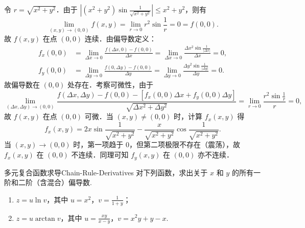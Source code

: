 \begin{myproof}
    令 $r = \sqrt{x^2 + y^2}$．由于 $\left| (x^2 + y^2) \sin \frac{1}{\sqrt{x^2+y^2}} \right| \leq x^2 + y^2$，则有
    \begin{equation}
        \lim_{(x,y) \to (0,0)} f(x,y) = \lim_{r \to 0} r^2 \sin \frac{1}{r} = 0 = f(0,0).
    \end{equation}
    故 $f(x,y)$ 在点 $(0,0)$ 连续．由偏导数定义：
    \begin{equation}
        \begin{aligned}
            f_x(0,0) & = \lim_{\Delta x \to 0} \frac{f(\Delta x, 0) - f(0,0)}{\Delta x} = \lim_{\Delta x \to 0} \frac{\Delta x^2 \sin \frac{1}{|\Delta x|}}{\Delta x} = 0, \\
            f_y(0,0) & = \lim_{\Delta y \to 0} \frac{f(0, \Delta y) - f(0,0)}{\Delta y} = \lim_{\Delta y \to 0} \frac{\Delta y^2 \sin \frac{1}{|\Delta y|}}{\Delta y} = 0.
        \end{aligned}
    \end{equation}
    故偏导数在 $(0,0)$ 处存在．考察可微性，由于
    \begin{equation}
        \lim_{(\Delta x, \Delta y) \to (0,0)} \frac{f(\Delta x, \Delta y) - f(0,0) - [f_x(0,0) \Delta x + f_y(0,0) \Delta y]}{\sqrt{\Delta x^2 + \Delta y^2}} = \lim_{r \to 0} \frac{r^2 \sin \frac{1}{r}}{r} = 0,
    \end{equation}
    故 $f(x,y)$ 在点 $(0,0)$ 可微．当 $(x,y) \neq (0,0)$ 时，计算 $f_x(x,y)$ 得
    \begin{equation}
        f_x(x,y) = 2x \sin \frac{1}{\sqrt{x^2 + y^2}} - \frac{x}{\sqrt{x^2 + y^2}} \cos \frac{1}{\sqrt{x^2 + y^2}}.
    \end{equation}
    当 $(x,y) \to (0,0)$ 时，第一项趋于 $0$，但第二项极限不存在（震荡），故 $f_x(x,y)$ 在 $(0,0)$ 不连续．同理可知 $f_y(x,y)$ 在 $(0,0)$ 亦不连续．
\end{myproof}

\begin{problem}{多元复合函数求导}{Chain-Rule-Derivatives}
    对下列函数，求出关于 $x$ 和 $y$ 的所有一阶和二阶（含混合）偏导数.
    \begin{enumerate}
        \item $z = u \ln v$，其中 $u = x^2$，$v = \frac{1}{1+y}$；
        \item $z = u \arctan v$，其中 $u = \frac{xy}{x-y}$，$v = x^2y + y - x$.
    \end{enumerate}
\end{problem}

